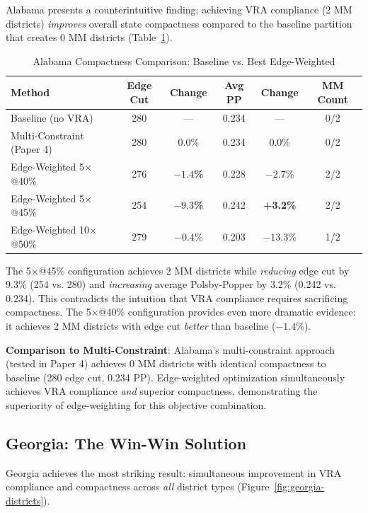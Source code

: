 Alabama presents a counterintuitive finding: achieving VRA compliance (2 MM districts) \emph{improves} overall state compactness compared to the baseline partition that creates 0 MM districts (Table~\ref{tab:alabama-detailed}).

\begin{table}[htbp]
\centering
\caption{Alabama Compactness Comparison: Baseline vs. Best Edge-Weighted}
\label{tab:alabama-detailed}
\begin{tabular}{lccccc}
\toprule
\textbf{Method} & \textbf{Edge Cut} & \textbf{Change} & \textbf{Avg PP} & \textbf{Change} & \textbf{MM Count} \\
\midrule
Baseline (no VRA)        & 280 & --- & 0.234 & --- & 0/2 \\
Multi-Constraint (Paper 4) & 280 & 0.0\% & 0.234 & 0.0\% & 0/2 \\
Edge-Weighted 5$\times$@40\%    & 276 & \textbf{$-1.4$\%} & 0.228 & $-2.7$\% & 2/2 \\
Edge-Weighted 5$\times$@45\%    & 254 & \textbf{$-9.3$\%} & 0.242 & \textbf{+3.2\%} & 2/2 \\
Edge-Weighted 10$\times$@50\%   & 279 & $-0.4$\% & 0.203 & $-13.3$\% & 1/2 \\
\bottomrule
\end{tabular}
\end{table}

The 5$\times$@45\% configuration achieves 2 MM districts while \emph{reducing} edge cut by 9.3\% (254 vs. 280) and \emph{increasing} average Polsby-Popper by 3.2\% (0.242 vs. 0.234). This contradicts the intuition that VRA compliance requires sacrificing compactness. The 5$\times$@40\% configuration provides even more dramatic evidence: it achieves 2 MM districts with edge cut \emph{better} than baseline ($-1.4$\%).

\textbf{Comparison to Multi-Constraint}: Alabama's multi-constraint approach (tested in Paper 4) achieves 0 MM districts with identical compactness to baseline (280 edge cut, 0.234 PP). Edge-weighted optimization simultaneously achieves VRA compliance \emph{and} superior compactness, demonstrating the superiority of edge-weighting for this objective combination.

\subsection{Georgia: The Win-Win Solution}

Georgia achieves the most striking result: simultaneous improvement in VRA compliance and compactness across \emph{all} district types (Figure~\ref{fig:georgia-districts}).

